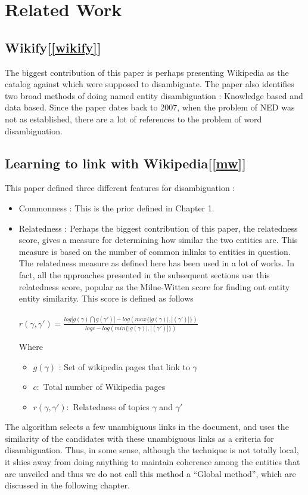  \section{Related Work}

\subsection{Wikify[\ref{wikify}]}
The biggest contribution of this paper is perhaps presenting Wikipedia as the 
catalog against which were supposed to disambiguate. The paper also identifies
two broad methods of doing named entity disambiguation : Knowledge based and 
data based. Since the paper dates back to 2007, when the problem of NED was 
not as established, there are a lot of references to the problem of word disambiguation.

\subsection{Learning to link with Wikipedia[\ref{mw}]}
This paper defined three different features for disambiguation : 
\begin{itemize}
 \item Commonness  : This is the prior defined in Chapter 1.
 \item Relatedness : Perhaps the biggest contribution of this paper, the relatedness score,
 gives a measure for determining how similar the two entities are. This measure 
 is based on the number of common inlinks to entities in question.
 The relatedness measure as defined here has been used in a lot of works. In fact, all
 the approaches presented in the subsequent sections use this relatedness score, popular
 as the Milne-Witten score for finding out entity entity similarity.
 This score is defined as follows \\ \\
 $ r(\gamma, \gamma') = \frac{log|g(\gamma) \bigcap g(\gamma')| - log(max\{|g(\gamma)|, |(\gamma')|\})} {log c - log(min\{|g(\gamma)|, |(\gamma')|\})}$ 
 
 Where 
   \begin{itemize}
    \item $g(\gamma)$ : Set of wikipedia pages that link to $\gamma$
    \item $c :$ Total number of Wikipedia pages
    \item $r(\gamma, \gamma') :$ Relatedness of topics $\gamma$ and $\gamma'$
   \end{itemize}\bigskip

 
\end{itemize}
The algorithm selects a few unambiguous links in the document, and uses the similarity of the candidates
with these unambiguous links as a criteria for disambiguation.
Thus, in some sense, although the technique is not totally local, it shies away from doing anything to maintain
coherence among the entities that are unveiled and thus we do not call this method a ``Global method'', which 
are discussed in the following chapter.

